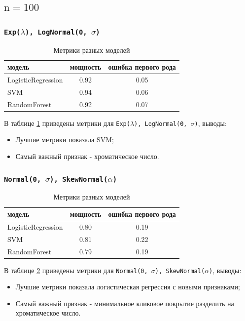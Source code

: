 \documentclass[12pt,a4paper]{report}
\begin{document}
\subsection{$\text{n} = 100$}
\subsubsection{\texttt{Exp($\lambda$), LogNormal(0, $\sigma$)}}
\begin{table}[htbp]
  \centering
  \caption{Метрики разных моделей}
  \label{tab:results_exp_lognormal_100}
  \begin{tabular}{@{} l c c @{}}
    \toprule
    модель & мощность & ошибка первого рода \\
    \midrule
    LogisticRegression & 0.92 & 0.05 \\
    SVM                & 0.94 & 0.06 \\
    RandomForest       & 0.92 & 0.07 \\
    \bottomrule
  \end{tabular}
\end{table}

В таблице \ref{tab:results_exp_lognormal_100} приведены метрики для \texttt{Exp($\lambda$), LogNormal(0, $\sigma$)}, выводы:
\begin{itemize}
    \item Лучшие метрики показала SVM;
    \item Самый важный признак - хроматическое число.
\end{itemize}

\subsubsection{\texttt{Normal(0, $\sigma$), SkewNormal($\alpha$)}}
\begin{table}[htbp]
  \centering
  \caption{Метрики разных моделей}
  \label{tab:results_normal_skewnormal_100}
  \begin{tabular}{@{} l c c @{}}
    \toprule
    модель & мощность & ошибка первого рода \\
    \midrule
    LogisticRegression & 0.80 & 0.19 \\
    SVM                & 0.81 & 0.22 \\
    RandomForest       & 0.79 & 0.19 \\
    \bottomrule
  \end{tabular}
\end{table}

В таблице \ref{tab:results_normal_skewnormal_100} приведены метрики для \texttt{Normal(0, $\sigma$), SkewNormal($\alpha$)}, выводы:
\begin{itemize}
    \item Лучшие метрики показала логистическая регрессия с новыми признаками;
    \item Самый важный признак - минимальное кликовое покрытие разделить на хроматическое число.
\end{itemize}
\end{document}

